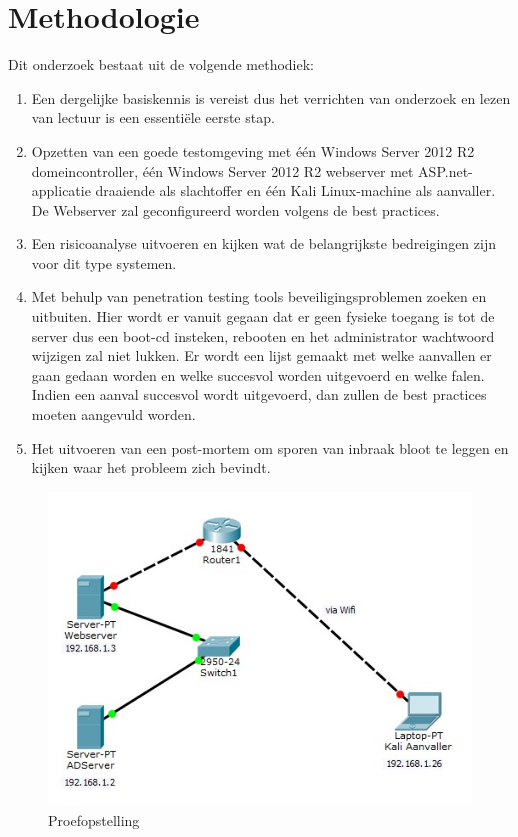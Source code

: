 \documentclass[pdftex,a4paper,12pt]{report}
\begin{document}
\chapter{Methodologie}
\label{ch:methodologie}


Dit onderzoek bestaat uit de volgende methodiek:
\begin{enumerate}
	\item Een dergelijke basiskennis is vereist dus het verrichten van onderzoek en lezen van lectuur is een essentiële eerste stap.
	\item Opzetten van een goede testomgeving met één Windows Server 2012 R2 domeincontroller, één Windows Server 2012 R2 webserver met ASP.net-applicatie draaiende als slachtoffer en één Kali Linux-machine als aanvaller. De Webserver zal geconfigureerd worden volgens de best practices.
	\item Een risicoanalyse uitvoeren en kijken wat de belangrijkste bedreigingen zijn voor dit type systemen.
	\item Met behulp van penetration testing tools beveiligingsproblemen zoeken en uitbuiten. Hier wordt er vanuit gegaan dat er geen fysieke toegang is tot de server dus een boot-cd insteken, rebooten en het administrator wachtwoord wijzigen zal niet lukken. Er wordt een lijst gemaakt met welke aanvallen er gaan gedaan worden en welke succesvol worden uitgevoerd en welke falen. Indien een aanval succesvol wordt uitgevoerd, dan zullen de best practices moeten aangevuld worden.
	\item Het uitvoeren van een post-mortem om sporen van inbraak bloot te leggen en kijken waar het probleem zich bevindt.
\end{enumerate}

\begin{figure}[H]
\begin{center}
\includegraphics{img/Situatie}
\end{center}
\caption{Proefopstelling}
\label{img:situatie}
\end{figure}
\end{document}

